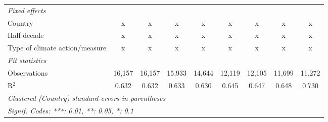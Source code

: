 \begin{table}[htbp]
\begin{tabular}{lcccccccc}
      \emph{Fixed effects}\\
      Country                                                             & x            & x            & x           & x       & x             & x             & x             & x\\  
      Half decade                                                         & x            & x            & x           & x       & x             & x             & x             & x\\  
      Type of climate action/measure                                      & x            & x            & x           & x       & x             & x             & x             & x\\  
      \midrule \emph{Fit statistics}\\
      Observations                                                        & 16,157       & 16,157       & 15,933      & 14,644  & 12,119        & 12,105        & 11,699        & 11,272\\  
      R$^2$                                                               & 0.632        & 0.632        & 0.633       & 0.630   & 0.645         & 0.647         & 0.648         & 0.730\\  
      \midrule
      \multicolumn{9}{l}{\emph{Clustered (Country) standard-errors in parentheses}}\\
      \multicolumn{9}{l}{\emph{Signif. Codes: ***: 0.01, **: 0.05, *: 0.1}}\\
   \end{tabular}
\end{table}


